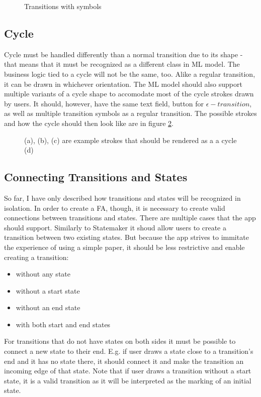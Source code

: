 \begin{figure}
    \centering
    \caption{Transitions with symbols}\label{transition-symbols}
\end{figure}

\subsection{Cycle}

Cycle must be handled differently than a normal transition due to its  shape - that means that it must be recognized as a different class in ML model. The business logic tied to a cycle will not be the same, too. Alike a regular transition, it can be drawn in whichever orientation. The ML model should also support multiple variants of a cycle shape to accomodate most of the cycle strokes drawn by users. It should, however, have the same text field, button for $\epsilon-transition$, as well as multiple transition symbols as a regular transition. The possible strokes and how the cycle should then look like are in figure \ref{cycle}.

\begin{figure}
    \centering
    \caption{(a), (b), (c) are example strokes that should be rendered as a a cycle (d)}\label{cycle}
\end{figure}

\subsection{Connecting Transitions and States}

So far, I have only described how transitions and states will be recognized in isolation. In order to create a FA, though, it is necessary to create valid connections between transitions and states. There are multiple cases that the app should support. Similarly to Statemaker \cite{state-maker} it shoud allow users to create a transition between two existing states. But because the app strives to immitate the experience of using a simple paper, it should be less restrictive and enable creating a transition:
\begin{itemize}
    \item without any state
    \item without a start state
    \item without an end state
    \item with both start and end states
\end{itemize}
For transitions that do not have states on both sides it must be possible to connect a new state to their end. E.g. if user draws a state close to a transition's end and it has no state there, it should connect it and make the transition an incoming edge of that state. Note that if user draws a transition without a start state, it is a valid transition as it will be interpreted as the marking of an initial state.

